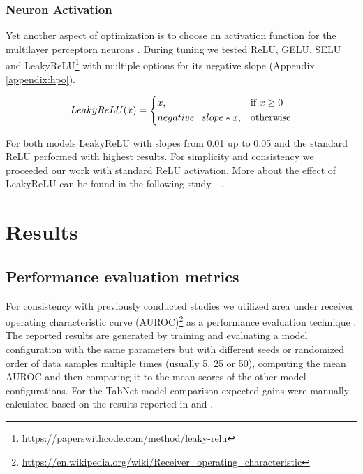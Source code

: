 \documentclass{article}
\begin{document}
\subsubsection{Neuron Activation}

Yet another aspect of optimization is to choose an activation function for the multilayer perceptorn neurons \cite{xu2015empirical}. During tuning we tested ReLU, GELU, SELU and LeakyReLU\footnote{\url{https://paperswithcode.com/method/leaky-relu}} with multiple options for its negative slope (Appendix \ref{appendix:hpo}).

\begin{equation}
    LeakyReLU(x)= 
    \begin{dcases}
        x,& \text{if } x\geq 0\\
        negative\_slope * x,              & \text{otherwise}
    \end{dcases}
\end{equation}

For both models LeakyReLU with slopes from 0.01 up to 0.05 and the standard ReLU performed with highest results. For simplicity and consistency we proceeded our work with standard ReLU activation. More about the effect of LeakyReLU can be found in the following study - \cite{fiedler2021simple}.

\section{Results}
\label{sec:results}

\subsection{Performance evaluation metrics}

For consistency with previously conducted studies we utilized area under receiver operating characteristic curve (AUROC)\footnote{\url{https://en.wikipedia.org/wiki/Receiver_operating_characteristic}} as a performance evaluation technique \cite{bradley1997use}. The reported results are generated by training and evaluating a model configuration with the same parameters but with different seeds or randomized order of data samples multiple times (usually 5, 25 or 50), computing the mean AUROC and then comparing it to the mean scores of the other model configurations. For the TabNet model comparison expected gains were manually calculated based on the results reported in \cite{Huang2020TabTransformerTD} and \cite{fiedler2021simple}.
\end{document}
